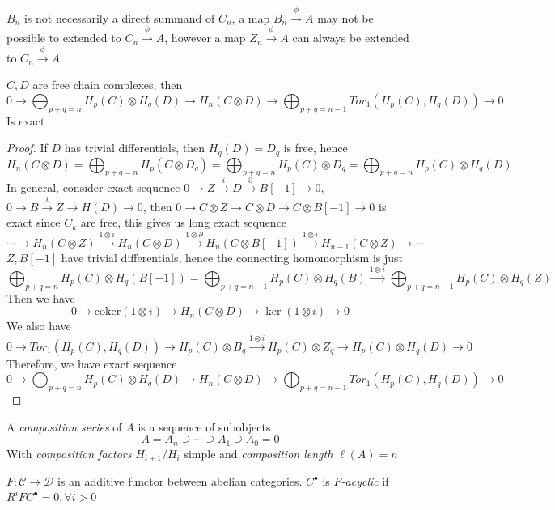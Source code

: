 \documentclass[main]{subfiles}
\begin{document}
\begin{remark}
$B_n$ is not necessarily a direct summand of $C_n$, a map $B_n\xrightarrow{\phi} A$ may not be possible to extended to $C_n\xrightarrow{\phi} A$, however a map $Z_n\xrightarrow{\phi} A$ can always be extended to $C_n\xrightarrow{\phi} A$
\end{remark}

\begin{theorem}\label{Algebraic Kunneth formula}
$C,D$ are free chain complexes, then
\[0\to\bigoplus_{p+q=n}H_p(C)\otimes H_q(D)\to H_n(C\otimes D)\to \bigoplus_{p+q=n-1}Tor_1(H_p(C),H_q(D))\to0\]
Is exact
\end{theorem}

\begin{proof}
If $D$ has trivial differentials, then $H_q(D)=D_q$ is free, hence
\[H_n(C\otimes D)=\bigoplus_{p+q=n}H_p(C\otimes D_q)=\bigoplus_{p+q=n}H_p(C)\otimes D_q=\bigoplus_{p+q=n}H_p(C)\otimes H_q(D)\]
In general, consider exact sequence $0\to Z\xrightarrow{i} D\xrightarrow{\partial}  B[-1]\to0$, $0\to B\xrightarrow{i}Z\to H(D)\to0$, then $0\to C\otimes Z\to C\otimes D\to C\otimes B[-1]\to 0$ is exact since $C_k$ are free, this gives us long exact sequence
\[\cdots\to H_n(C\otimes Z)\xrightarrow{1\otimes i}H_n(C\otimes D)\xrightarrow{1\otimes \partial}H_n(C\otimes B[-1])\xrightarrow{1\otimes i} H_{n-1}(C\otimes Z)\to \cdots\]
$Z,B[-1]$ have trivial differentials, hence the connecting homomorphism is just
\[\bigoplus_{p+q=n}H_{p}(C)\otimes H_{q}(B[-1])=\bigoplus_{p+q=n-1}H_{p}(C)\otimes H_q(B)\xrightarrow{1\otimes i}\bigoplus_{p+q=n-1}H_{p}(C)\otimes H_{q}(Z)\]
Then we have
\[0\to\mathrm{coker}(1\otimes i)\to H_n(C\otimes D)\to\ker(1\otimes i)\to0\]
We also have
\[0\to Tor_1(H_p(C),H_q(D))\to H_p(C)\otimes B_q\xrightarrow{1\otimes i} H_p(C)\otimes Z_q\to H_p(C)\otimes H_q(D)\to0\]
Therefore, we have exact sequence
\[0\to\bigoplus_{p+q=n}H_p(C)\otimes H_q(D)\to H_n(C\otimes D)\to \bigoplus_{p+q=n-1}Tor_1(H_p(C),H_q(D))\to0\]
\end{proof}

\begin{definition}
A \textit{composition series} of $A$ is a sequence of subobjects
\[A=A_n\supseteq \cdots\supseteq A_1\supseteq A_0=0\]
With \textit{composition factors} $H_{i+1}/H_i$ simple and \textit{composition length} $\ell(A)=n$
\end{definition}

\begin{definition}
$F:\mathscr C\to\mathscr D$ is an additive functor between abelian categories. $C^\bullet$ is \textit{$F$-acyclic} if $R^iFC^\bullet=0,\forall i>0$
\end{definition}
\end{document}
